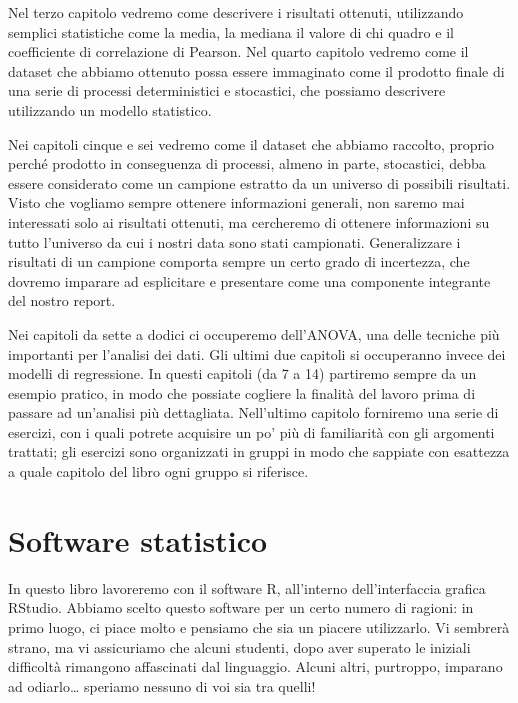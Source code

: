 \documentclass[
  12pt,
]{book}
\begin{document}
Nel terzo capitolo vedremo come descrivere i risultati ottenuti, utilizzando semplici statistiche come la media, la mediana il valore di chi quadro e il coefficiente di correlazione di Pearson. Nel quarto capitolo vedremo come il dataset che abbiamo ottenuto possa essere immaginato come il prodotto finale di una serie di processi deterministici e stocastici, che possiamo descrivere utilizzando un modello statistico.

Nei capitoli cinque e sei vedremo come il dataset che abbiamo raccolto, proprio perché prodotto in conseguenza di processi, almeno in parte, stocastici, debba essere considerato come un campione estratto da un universo di possibili risultati. Visto che vogliamo sempre ottenere informazioni generali, non saremo mai interessati solo ai risultati ottenuti, ma cercheremo di ottenere informazioni su tutto l'universo da cui i nostri data sono stati campionati. Generalizzare i risultati di un campione comporta sempre un certo grado di incertezza, che dovremo imparare ad esplicitare e presentare come una componente integrante del nostro report.

Nei capitoli da sette a dodici ci occuperemo dell'ANOVA, una delle tecniche più importanti per l'analisi dei dati. Gli ultimi due capitoli si occuperanno invece dei modelli di regressione. In questi capitoli (da 7 a 14) partiremo sempre da un esempio pratico, in modo che possiate cogliere la finalità del lavoro prima di passare ad un'analisi più dettagliata. Nell'ultimo capitolo forniremo una serie di esercizi, con i quali potrete acquisire un po' più di familiarità con gli argomenti trattati; gli esercizi sono organizzati in gruppi in modo che sappiate con esattezza a quale capitolo del libro ogni gruppo si riferisce.

\hypertarget{software-statistico}{%
\section*{Software statistico}\label{software-statistico}}

In questo libro lavoreremo con il software R, all'interno dell'interfaccia grafica RStudio. Abbiamo scelto questo software per un certo numero di ragioni: in primo luogo, ci piace molto e pensiamo che sia un piacere utilizzarlo. Vi sembrerà strano, ma vi assicuriamo che alcuni studenti, dopo aver superato le iniziali difficoltà rimangono affascinati dal linguaggio. Alcuni altri, purtroppo, imparano ad odiarlo\ldots{} speriamo nessuno di voi sia tra quelli!
\end{document}
